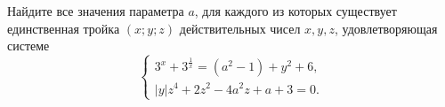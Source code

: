 \begin{ex}
	\begin{condition}
		Найдите все значения параметра \( a \), для каждого из которых существует единственная тройка \( (x;y;z) \) действительных чисел \( x,y,z \), удовлетворяющая системе
		\[ \left\{
		\begin{array}{l}
			3^x+3^{\frac{1}{x}}=(a^2-1)+y^2+6,\\
			|y|z^4+2z^2-4a^2z+a+3=0.
		\end{array}
		\right. \]
	\end{condition}
\end{ex}